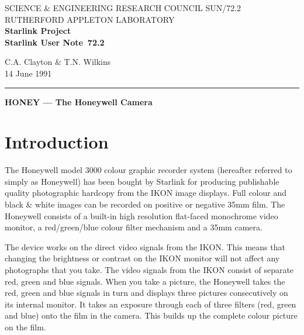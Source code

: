 \pagestyle{myheadings}

\newcommand{\stardoccategory}  {Starlink User Note}
\newcommand{\stardocinitials}  {SUN}
\newcommand{\stardocnumber}    {72.2}
\newcommand{\stardocauthors}   {C.A. Clayton \& T.N. Wilkins}
\newcommand{\stardocdate}      {14 June 1991}
\newcommand{\stardoctitle}     {HONEY --- The Honeywell Camera}

\newcommand{\stardocname}{\stardocinitials /\stardocnumber}
\markright{\stardocname}
\setlength{\textwidth}{160mm}
\setlength{\textheight}{240mm}
\setlength{\topmargin}{-5mm}
\setlength{\oddsidemargin}{0mm}
\setlength{\evensidemargin}{0mm}
\setlength{\parindent}{0mm}
\setlength{\parskip}{\medskipamount}
\setlength{\unitlength}{1mm}


\thispagestyle{empty}
SCIENCE \& ENGINEERING RESEARCH COUNCIL \hfill \stardocname\\
RUTHERFORD APPLETON LABORATORY\\
{\large\bf Starlink Project\\}
{\large\bf \stardoccategory\ \stardocnumber}
\begin{flushright}
\stardocauthors\\
\stardocdate
\end{flushright}
\vspace{-4mm}
\rule{\textwidth}{0.5mm}
\vspace{5mm}
\begin{center}
{\Large\bf \stardoctitle}
\end{center}
\vspace{5mm}

\section{Introduction}

The Honeywell model 3000 colour graphic recorder system (hereafter referred to
simply as Honeywell) has been bought by Starlink for producing publishable
quality photographic hardcopy from the IKON image displays. Full colour and
black \& white images can be recorded on positive or negative 35mm film.
The Honeywell consists of a built-in high resolution flat-faced monochrome
video monitor, a red/green/blue colour filter mechanism and a 35mm camera.

The device works on the direct video signals from the IKON. This means that
changing the brightness or contrast on the IKON monitor will not affect any
photographs that you take. The video signals from the IKON consist of separate
red, green and blue signals. When you take a picture, the Honeywell takes the
red, green and blue signals in turn and displays three pictures consecutively
on its internal monitor. It takes an exposure through each of three filters
(red, green and blue) onto the film in the camera. This builds up the complete
colour picture on the film.

